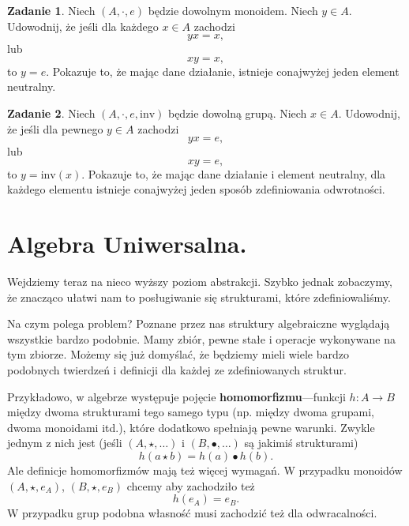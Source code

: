 \documentclass{article}
\theoremstyle{definition}
\newtheorem{exercise}{Zadanie}[section]
\begin{document}
\begin{exercise}
    Niech $(A, \cdot, e)$ będzie dowolnym monoidem.
	Niech $y \in A$.
    Udowodnij, że jeśli dla każdego $x \in A$ zachodzi
	\begin{equation}
        yx = x,
	\end{equation}
	lub
	\begin{equation}
        xy = x,
	\end{equation}
    to $y = e$.
    Pokazuje to,
		że mając dane działanie,
		istnieje conajwyżej jeden element neutralny.
\end{exercise}

\begin{exercise}
    Niech $(A, \cdot, e, \mathrm{inv})$ będzie dowolną grupą.
	Niech $x \in A$.
    Udowodnij, że jeśli dla pewnego $y \in A$ zachodzi
	\begin{equation}
        yx = e,
	\end{equation}
	lub
	\begin{equation}
        xy = e,
	\end{equation}
    to $y = \mathrm{inv}(x)$.
    Pokazuje to,
		że mając dane działanie i element neutralny,
        dla każdego elementu istnieje conajwyżej jeden sposób zdefiniowania odwrotności.
\end{exercise}

\section{Algebra Uniwersalna.}
Wejdziemy teraz na nieco wyższy poziom abstrakcji.
Szybko jednak zobaczymy,
że znacząco ułatwi nam to posługiwanie się strukturami,
które zdefiniowaliśmy.

Na czym polega problem?
Poznane przez nas struktury algebraiczne wyglądają wszystkie bardzo podobnie.
Mamy zbiór, pewne stałe i operacje wykonywane na tym zbiorze.
Możemy się już domyślać,
	że będziemy mieli wiele bardzo podobnych twierdzeń i definicji dla każdej ze zdefiniowanych struktur.

Przykładowo,
	w algebrze występuje pojęcie \textbf{homomorfizmu}---funkcji $h: A \to B$ między dwoma strukturami
	tego samego typu (np. między dwoma grupami, dwoma monoidami itd.),
	które dodatkowo spełniają pewne warunki.
Zwykle jednym z nich jest (jeśli $(A, \star, \dots)$ i $(B, \bullet, \dots)$ są jakimiś strukturami)
\begin{equation}
	h(a\star b) = h(a) \bullet h(b).
\end{equation}
Ale definicje homomorfizmów mają też więcej wymagań.
W przypadku monoidów $(A, \star, e_A)$, $(B, \star, e_B)$ chcemy aby zachodziło też
\begin{equation}
	h(e_A) = e_B.
\end{equation}
W przypadku grup podobna własność musi zachodzić też dla odwracalności.
\end{document}
